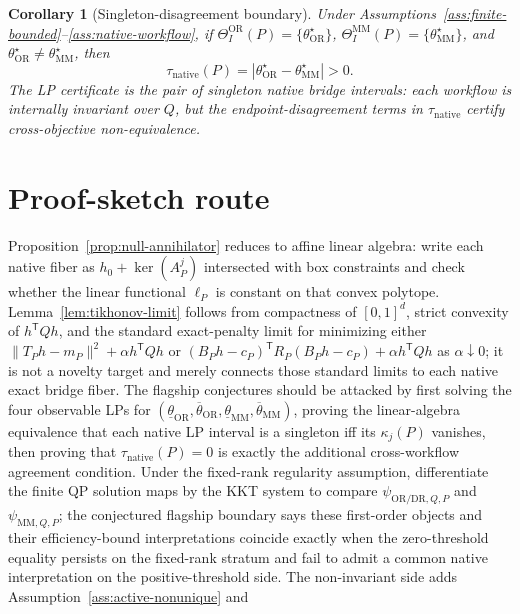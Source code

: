 \documentclass[11pt]{article}
\newcommand{\transpose}{\mathsf{T}}
\theoremstyle{definition}
\theoremstyle{plain}
\newtheorem{corollary}{Corollary}
\theoremstyle{remark}
\begin{document}
\begin{corollary}[Singleton-disagreement boundary]\label{cor:singleton-disagreement}
Under Assumptions~\ref{ass:finite-bounded}--\ref{ass:native-workflow}, if
\(\Theta_I^{\mathrm{OR}}(P)=\{\theta_{\mathrm{OR}}^\star\}\),
\(\Theta_I^{\mathrm{MM}}(P)=\{\theta_{\mathrm{MM}}^\star\}\), and
\(\theta_{\mathrm{OR}}^\star\neq\theta_{\mathrm{MM}}^\star\), then
\[
\tau_{\mathrm{native}}(P)=|\theta_{\mathrm{OR}}^\star-\theta_{\mathrm{MM}}^\star|>0.
\]
The LP certificate is the pair of singleton native bridge intervals: each
workflow is internally invariant over \(Q\), but the endpoint-disagreement
terms in \(\tau_{\mathrm{native}}\) certify cross-objective non-equivalence.
\end{corollary}

\section{Proof-sketch route}
Proposition~\ref{prop:null-annihilator} reduces to affine linear algebra:
write each native fiber as \(h_0+\operatorname{ker}(A_P^j)\) intersected
with box constraints and check whether the linear functional \(\ell_P\) is
constant on that convex polytope.
Lemma~\ref{lem:tikhonov-limit} follows from compactness of \([0,1]^d\),
strict convexity of \(h^\transpose Qh\), and the standard exact-penalty limit
for minimizing either \(\|T_Ph-m_P\|^2+\alpha h^\transpose Qh\) or
\((B_Ph-c_P)^\transpose R_P(B_Ph-c_P)+\alpha h^\transpose Qh\) as
\(\alpha\downarrow0\); it is not a novelty target and merely connects those
standard limits to each native exact bridge fiber.
The flagship conjectures should be attacked by first solving the four
observable LPs for
\((\underline\theta_{\mathrm{OR}},\overline\theta_{\mathrm{OR}},
\underline\theta_{\mathrm{MM}},\overline\theta_{\mathrm{MM}})\), proving the
linear-algebra equivalence that each native LP interval is a singleton iff
its \(\kappa_j(P)\) vanishes, then proving that
\(\tau_{\mathrm{native}}(P)=0\) is exactly the additional cross-workflow
agreement condition.  Under the fixed-rank regularity assumption, differentiate
the finite QP solution maps by the KKT system to compare
\(\psi_{\mathrm{OR/DR},Q,P}\) and \(\psi_{\mathrm{MM},Q,P}\); the conjectured
flagship boundary says these first-order objects and their efficiency-bound
interpretations coincide exactly when the zero-threshold equality persists on
the fixed-rank stratum and fail to admit a common native interpretation on the
positive-threshold side.  The
non-invariant side adds Assumption~\ref{ass:active-nonunique} and
\end{document}

